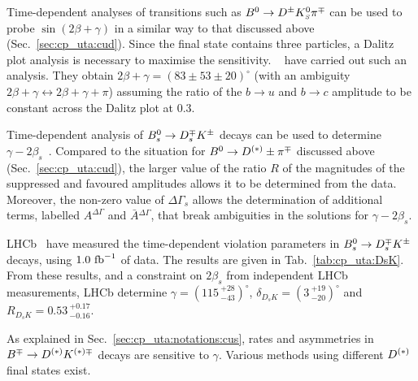 \label{sec:cp_uta:cus-td}


Time-dependent analyses of transitions such as $B^0 \to D^\pm K^0_{\scriptscriptstyle S} \pi^\mp$ can
be used to probe $\sin(2\beta+\gamma)$ in a similar way to that discussed
above (Sec.~\ref{sec:cp_uta:cud}). Since the final state contains three
particles, a Dalitz plot analysis is necessary to maximise the
sensitivity. \babar~\cite{Aubert:2007qe} have carried out such an
analysis. They obtain $2\beta+\gamma = \left( 83 \pm 53 \pm 20 \right)^\circ$
(with an ambiguity $2\beta+\gamma \leftrightarrow 2\beta+\gamma+\pi$) assuming
the ratio of the $b \to u$ and $b \to c$ amplitude to be constant across the
Dalitz plot at 0.3.


Time-dependent analysis of $B^0_s \to D_s^\mp K^\pm$ decays can be used to determine $\gamma-2\beta_s$~\cite{Dunietz:1987bv,Aleksan:1991nh,Fleischer:2003yb}.
Compared to the situation for $B^0 \to D^{(*)}\pm \pi^\mp$ discussed above (Sec.~\ref{sec:cp_uta:cud}), the larger value of the ratio $R$ of the magnitudes of the suppressed and favoured amplitudes allows it to be determined from the data.  
Moreover, the non-zero value of $\Delta \Gamma_s$ allows the determination of additional terms, labelled $A^{\Delta\Gamma}$ and $\bar{A}{}^{\Delta\Gamma}$, that break ambiguities in the solutions for $\gamma-2\beta_s$.

LHCb~\cite{Aaij:2014fba} have measured the time-dependent \CP violation parameters in $B^0_s \to D_s^\mp K^\pm$ decays, using $1.0 \ {\rm fb}^{-1}$ of data.  
The results are given in Tab.~\ref{tab:cp_uta:DsK}.
From these results, and a constraint on $2\beta_s$ from independent LHCb measurements, LHCb determine $\gamma = (115 \,^{+28}_{-43})^\circ$, $\delta_{D_sK} = (3 \,^{+19}_{-20})^\circ$ and $R_{D_sK} = 0.53 \,^{+0.17}_{-0.16}$. 



\clearpage
{}
\label{sec:cp_uta:cus}

As explained in Sec.~\ref{sec:cp_uta:notations:cus},
rates and asymmetries in $B^\mp \to D^{(*)} K^{(*)\mp}$ decays
are sensitive to $\gamma$.
Various methods using different $D^{(*)}$ final states exist.


